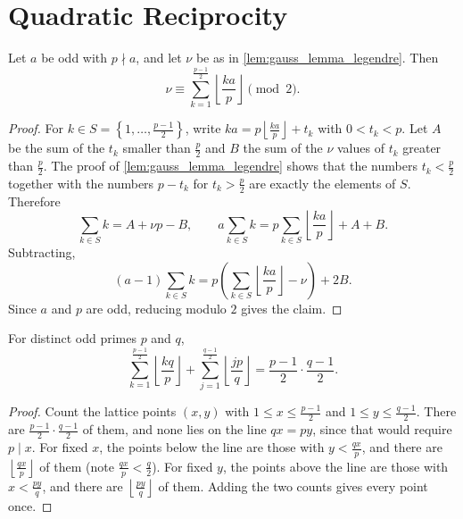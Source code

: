 \section{Quadratic Reciprocity}

\begin{lemma}\label{lem:eisenstein_parity}
    Let $a$ be odd with $p \nmid a$, and let $\nu$ be as in \cref{lem:gauss_lemma_legendre}. Then
    \begin{equation*}
        \nu \equiv \sum_{k=1}^{\frac{p-1}{2}} \left\lfloor \frac{ka}{p} \right\rfloor \pmod 2.
    \end{equation*}
\end{lemma}
\begin{proof}
    For $k \in S = \left\{1, \dots, \frac{p-1}{2}\right\}$, write $ka = p\left\lfloor \frac{ka}{p} \right\rfloor + t_k$ with $0 < t_k < p$. Let $A$ be the sum of the $t_k$ smaller than $\frac{p}{2}$ and $B$ the sum of the $\nu$ values of $t_k$ greater than $\frac{p}{2}$. The proof of \cref{lem:gauss_lemma_legendre} shows that the numbers $t_k < \frac{p}{2}$ together with the numbers $p - t_k$ for $t_k > \frac{p}{2}$ are exactly the elements of $S$. Therefore
    \begin{equation*}
        \sum_{k \in S} k = A + \nu p - B, \qquad a\sum_{k \in S} k = p\sum_{k \in S}\left\lfloor \frac{ka}{p} \right\rfloor + A + B.
    \end{equation*}
    Subtracting,
    \begin{equation*}
        (a - 1)\sum_{k \in S} k = p\left(\sum_{k \in S}\left\lfloor \frac{ka}{p} \right\rfloor - \nu\right) + 2B.
    \end{equation*}
    Since $a$ and $p$ are odd, reducing modulo $2$ gives the claim.
\end{proof}

\begin{lemma}\label{lem:lattice_points}
    For distinct odd primes $p$ and $q$,
    \begin{equation*}
        \sum_{k=1}^{\frac{p-1}{2}} \left\lfloor \frac{kq}{p} \right\rfloor + \sum_{j=1}^{\frac{q-1}{2}} \left\lfloor \frac{jp}{q} \right\rfloor = \frac{p-1}{2}\cdot\frac{q-1}{2}.
    \end{equation*}
\end{lemma}
\begin{proof}
    Count the lattice points $(x,y)$ with $1 \le x \le \frac{p-1}{2}$ and $1 \le y \le \frac{q-1}{2}$. There are $\frac{p-1}{2}\cdot\frac{q-1}{2}$ of them, and none lies on the line $qx = py$, since that would require $p \mid x$. For fixed $x$, the points below the line are those with $y < \frac{qx}{p}$, and there are $\left\lfloor \frac{qx}{p} \right\rfloor$ of them (note $\frac{qx}{p} < \frac{q}{2}$). For fixed $y$, the points above the line are those with $x < \frac{py}{q}$, and there are $\left\lfloor \frac{py}{q} \right\rfloor$ of them. Adding the two counts gives every point once.
\end{proof}

